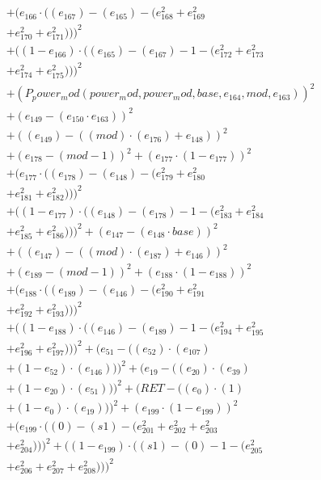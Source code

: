 \documentclass[10pt, a4paper]{article}
\begin{document}
\begin{align*}
& + (e_{166}  \cdot  ((e_{167}) - (e_{165}) - (e_{168}^{2} + e_{169}^{2} \\
& + e_{170}^{2} + e_{171}^{2})))^{2} \\
& + ((1 - e_{166})  \cdot  ((e_{165}) - (e_{167}) - 1 - (e_{172}^{2} + e_{173}^{2} \\
& + e_{174}^{2} + e_{175}^{2})))^{2} \\
& + (P_power_mod(power_mod, power_mod, base, e_{164}, mod, e_{163}))^{2} \\
& + (e_{149} - (e_{150}  \cdot  e_{163}))^{2} \\
& + ((e_{149}) - ((mod)  \cdot  (e_{176}) + e_{148}))^{2} \\
& + (e_{178} - (mod - 1))^{2} + (e_{177}  \cdot  (1 - e_{177}))^{2} \\
& + (e_{177}  \cdot  ((e_{178}) - (e_{148}) - (e_{179}^{2} + e_{180}^{2} \\
& + e_{181}^{2} + e_{182}^{2})))^{2} \\
& + ((1 - e_{177})  \cdot  ((e_{148}) - (e_{178}) - 1 - (e_{183}^{2} + e_{184}^{2} \\
& + e_{185}^{2} + e_{186}^{2})))^{2} + (e_{147} - (e_{148}  \cdot  base))^{2} \\
& + ((e_{147}) - ((mod)  \cdot  (e_{187}) + e_{146}))^{2} \\
& + (e_{189} - (mod - 1))^{2} + (e_{188}  \cdot  (1 - e_{188}))^{2} \\
& + (e_{188}  \cdot  ((e_{189}) - (e_{146}) - (e_{190}^{2} + e_{191}^{2} \\
& + e_{192}^{2} + e_{193}^{2})))^{2} \\
& + ((1 - e_{188})  \cdot  ((e_{146}) - (e_{189}) - 1 - (e_{194}^{2} + e_{195}^{2} \\
& + e_{196}^{2} + e_{197}^{2})))^{2} + (e_{51} - ((e_{52})  \cdot  (e_{107}) \\
& + (1 - e_{52})  \cdot  (e_{146})))^{2} + (e_{19} - ((e_{20})  \cdot  (e_{39}) \\
& + (1 - e_{20})  \cdot  (e_{51})))^{2} + (RET - ((e_{0})  \cdot  (1) \\
& + (1 - e_{0})  \cdot  (e_{19})))^{2} + (e_{199}  \cdot  (1 - e_{199}))^{2} \\
& + (e_{199}  \cdot  ((0) - (s1) - (e_{201}^{2} + e_{202}^{2} + e_{203}^{2} \\
& + e_{204}^{2})))^{2} + ((1 - e_{199})  \cdot  ((s1) - (0) - 1 - (e_{205}^{2} \\
& + e_{206}^{2} + e_{207}^{2} + e_{208}^{2})))^{2} \\

\end{align*}
\end{document}
